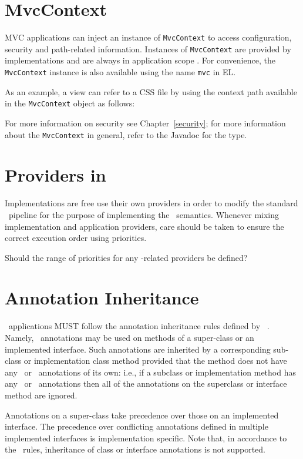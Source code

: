 \section{MvcContext}
\label{mvc_context}

MVC applications can inject an instance of {\tt MvcContext} to access configuration,
security and path-related information. Instances of {\tt MvcContext} are provided
by implementations and are always in application scope . 
For convenience, the
{\tt MvcContext} instance is also available using the name {\tt mvc} in EL.

As an example, a view can refer to a CSS file by using the context path available in 
the {\tt MvcContext} object as follows:



For more information on security see Chapter~\ref{security}; for more information 
about the {\tt MvcContext} in general, refer to the Javadoc for the type.

\section{Providers in \mvc}
\label{providers_in_mvc}

Implementations are free use their own providers in order to modify the standard 
\jaxrs\ pipeline for the purpose of implementing the \mvc\ semantics. Whenever mixing 
implementation and application providers, care should be taken to ensure the correct 
execution order using priorities.

\begin{ednote}
Should the range of priorities for any \mvc -related providers be defined?
\end{ednote}

\section{Annotation Inheritance}
\label{annotation_inheritance}

\mvc\  applications MUST follow the annotation inheritance rules defined by \jaxrs\ 
. Namely, \mvc\ annotations may be used on methods of a 
super-class or an implemented interface. Such annotations are inherited 
by a corresponding sub-class or implementation class method provided that the method does 
not have any \mvc\ or \jaxrs\ annotations of its own: 
i.e., if a subclass or implementation method has any \mvc\ or \jaxrs\ annotations then all of the
annotations on the superclass or interface method are ignored.

Annotations on a super-class take precedence over those on an implemented interface. The
precedence over conflicting annotations defined in multiple implemented interfaces is implementation 
specific. Note that, in accordance to the \jaxrs\ rules, inheritance of class or interface annotations 
is not supported. 
